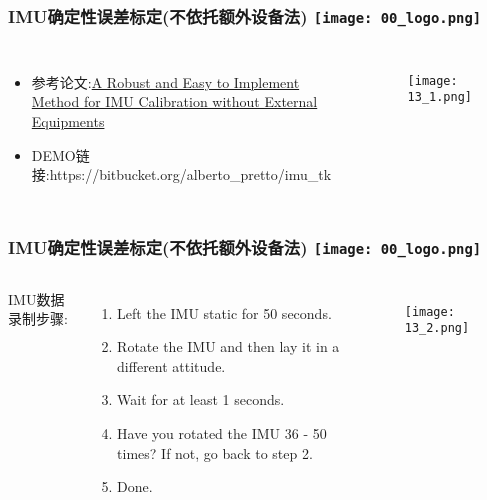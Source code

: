 \begin{comment}
\end{comment}
\begin{frame}
\frametitle{IMU确定性误差标定(不依托额外设备法) \hfill \texttt{[image: 00\_logo.png]}}
\begin{columns}
  
  
  \begin{itemize}
    \item 参考论文:\href{http://www.dis.uniroma1.it/~pretto/papers/tpm_icra2014.pdf}{A Robust and Easy to Implement Method for IMU Calibration without External Equipments} 
    \item DEMO链接:https://bitbucket.org/alberto\_pretto/imu\_tk
  \end{itemize}
	\begin{figure}[h]
		\texttt{[image: 13\_1.png]}
  \end{figure}
  

\end{columns}
\end{frame} 




\begin{comment}
\end{comment}
\begin{frame}
\frametitle{IMU确定性误差标定(不依托额外设备法) \hfill \texttt{[image: 00\_logo.png]}}
\begin{columns}
  
  
  IMU数据录制步骤:
  \begin{enumerate}
    \item Left the IMU static for 50 seconds.
    \item Rotate the IMU and then lay it in a different attitude.
    \item Wait for at least 1 seconds.
    \item Have you rotated the IMU 36 - 50 times? If not, go back to step 2.
    \item Done.
  \end{enumerate}
  
	\begin{figure}[h]
		\texttt{[image: 13\_2.png]}
  \end{figure}
  

\end{columns}
\end{frame} 

